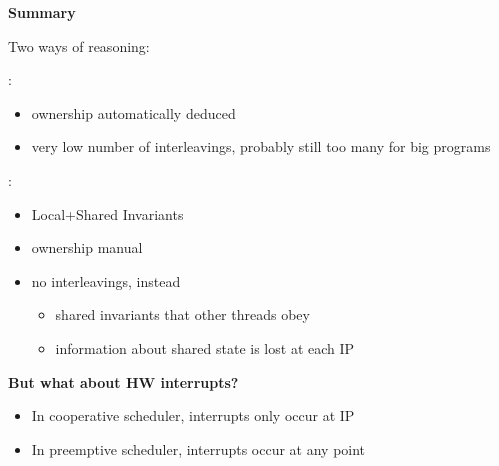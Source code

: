 \documentclass{beamer}
\begin{document}
\begin{frame}
\textbf{Summary}

Two ways of reasoning: 
\begin{description} 
	\item[Cooperative scheduler]:
	
	\begin{itemize}
		\item ownership automatically deduced
		\item very low number of interleavings, probably still too many for big programs
	\end{itemize} 
	\item<2->[Sequential modular reasoning]:
	
	\begin{itemize} 
		\item Local+Shared Invariants
		\item ownership manual
		\item no interleavings, instead 
		
			\begin{itemize} 
				\item shared invariants that other threads obey
				\item information about shared state is lost at each IP
			\end{itemize}
	\end{itemize}
\end{description}
\end{frame}

\begin{frame}
\textbf{But what about HW interrupts?}

\begin{itemize}
	\item In cooperative scheduler, interrupts only occur at IP
	\begin{center} 
\end{center} 
	\item<2-> In preemptive scheduler, interrupts occur at any point
	\begin{center} 
	\end{center} 
\end{itemize}

\end{frame}
\end{document}

